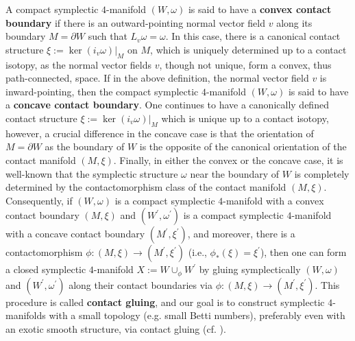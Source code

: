 \documentclass[11pt]{amsart}
\theoremstyle{plain}
\numberwithin{theorem}{section}
\theoremstyle{definition}
\begin{document}
A compact symplectic $4$-manifold $(W,\omega)$ is said to have a {\bf convex contact boundary} 
if there is an outward-pointing normal vector field $v$ along its boundary $M=\partial W$ such that
$L_v \omega =\omega$. In this case, there is a canonical contact structure $\xi:=\ker (i_v\omega)|_M$
on $M$, which is uniquely determined up to a contact isotopy, as the normal vector fields $v$, though not unique, form a convex, thus path-connected, space. If in the above definition, the normal vector field $v$ is inward-pointing, then the compact symplectic $4$-manifold $(W,\omega)$ is said to have a
{\bf concave contact boundary}. One continues to have a canonically defined contact structure 
$\xi:=\ker (i_v\omega)|_M$ which is unique up to a contact isotopy, however, a crucial difference in the concave case is that the orientation of $M=\partial W$ as the boundary of $W$ is the opposite of the 
canonical orientation of the contact manifold $(M,\xi)$. Finally, in either the convex or the concave case, it is well-known that the symplectic structure $\omega$ near the boundary of $W$ is completely determined by the 
contactomorphism class of the contact manifold $(M,\xi)$. Consequently, if $(W,\omega)$ is a
compact symplectic $4$-manifold with a convex contact boundary $(M,\xi)$ and 
$(W^\prime,\omega^\prime)$ is a compact symplectic $4$-manifold with a concave contact 
boundary $(M^\prime,\xi^\prime)$, and moreover, there is a contactomorphism $\phi:(M,\xi)
\rightarrow (M^\prime,\xi^\prime)$ (i.e., $\phi_\ast(\xi)=\xi^\prime$), then one can form a closed 
symplectic $4$-manifold $X:=W\cup_\phi W^\prime$ by gluing symplectically $(W,\omega)$
and $(W^\prime,\omega^\prime)$ along their contact boundaries via $\phi:(M,\xi)
\rightarrow (M^\prime,\xi^\prime)$. This procedure is called {\bf contact gluing}, and our goal is to construct symplectic $4$-manifolds with a small topology (e.g. small Betti numbers), preferably even with an exotic smooth structure, via contact gluing (cf. \cite{C}). 
\end{document}
